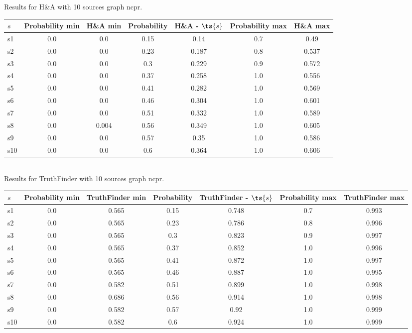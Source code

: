 \documentclass{article}
\begin{document}
\noindent Results for H\&A with 10 sources graph ncpr.

\noindent\begin{tabular}{|l|c|c|c|c|c|c|}
\hline
$s$& Probability min & H\&A min & Probability & H\&A - $\ts{s}$ & Probability max & H\&A max\\
\hline
s1 &0.0 & 0.0 & 0.15 & 0.14 & 0.7 & 0.49\\
\hline
s2 &0.0 & 0.0 & 0.23 & 0.187 & 0.8 & 0.537\\
\hline
s3 &0.0 & 0.0 & 0.3 & 0.229 & 0.9 & 0.572\\
\hline
s4 &0.0 & 0.0 & 0.37 & 0.258 & 1.0 & 0.556\\
\hline
s5 &0.0 & 0.0 & 0.41 & 0.282 & 1.0 & 0.569\\
\hline
s6 &0.0 & 0.0 & 0.46 & 0.304 & 1.0 & 0.601\\
\hline
s7 &0.0 & 0.0 & 0.51 & 0.332 & 1.0 & 0.589\\
\hline
s8 &0.0 & 0.004 & 0.56 & 0.349 & 1.0 & 0.605\\
\hline
s9 &0.0 & 0.0 & 0.57 & 0.35 & 1.0 & 0.586\\
\hline
s10 &0.0 & 0.0 & 0.6 & 0.364 & 1.0 & 0.606\\
\hline
\end{tabular}\\

\noindent Results for TruthFinder with 10 sources graph ncpr.

\noindent\begin{tabular}{|l|c|c|c|c|c|c|}
\hline
$s$& Probability min & TruthFinder min & Probability & TruthFinder - $\ts{s}$ & Probability max & TruthFinder max\\
\hline
s1 &0.0 & 0.565 & 0.15 & 0.748 & 0.7 & 0.993\\
\hline
s2 &0.0 & 0.565 & 0.23 & 0.786 & 0.8 & 0.996\\
\hline
s3 &0.0 & 0.565 & 0.3 & 0.823 & 0.9 & 0.997\\
\hline
s4 &0.0 & 0.565 & 0.37 & 0.852 & 1.0 & 0.996\\
\hline
s5 &0.0 & 0.565 & 0.41 & 0.872 & 1.0 & 0.997\\
\hline
s6 &0.0 & 0.565 & 0.46 & 0.887 & 1.0 & 0.995\\
\hline
s7 &0.0 & 0.582 & 0.51 & 0.899 & 1.0 & 0.998\\
\hline
s8 &0.0 & 0.686 & 0.56 & 0.914 & 1.0 & 0.998\\
\hline
s9 &0.0 & 0.582 & 0.57 & 0.92 & 1.0 & 0.999\\
\hline
s10 &0.0 & 0.582 & 0.6 & 0.924 & 1.0 & 0.999\\
\hline
\end{tabular}\\
\end{document}

